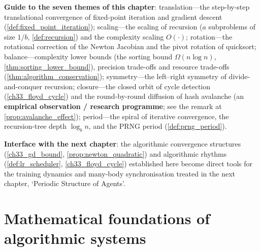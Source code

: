 \begin{definition}
\textbf{Guide to the seven themes of this chapter}: translation---the step-by-step translational convergence of fixed-point iteration and gradient descent (\cref{def:fixed_point_iteration}); scaling---the scaling of recursion ($a$ subproblems of size $1/b$, \cref{def:recursion}) and the complexity scaling $O(\cdot)$; rotation---the rotational correction of the Newton Jacobian and the pivot rotation of quicksort; balance---complexity lower bounds (the sorting bound $\Omega(n\log n)$, \cref{thm:sorting_lower_bound}), precision trade-offs and resource trade-offs (\cref{thm:algorithm_conservation}); symmetry---the left--right symmetry of divide-and-conquer recursion; closure---the closed orbit of cycle detection (\cref{ch33_floyd_cycle}) and the round-by-round diffusion of hash avalanche (an \textbf{empirical observation / research programme}; see the remark at \cref{prop:avalanche_effect}); period---the spiral of iterative convergence, the recursion-tree depth $\log_b n$, and the PRNG period (\cref{def:prng_period}).

\textbf{Interface with the next chapter}: the algorithmic convergence structures (\cref{ch33_gd_bound}, \cref{prop:newton_quadratic}) and algorithmic rhythms (\cref{def:lr_scheduler}, \cref{ch33_floyd_cycle}) established here become direct tools for the training dynamics and many-body synchronisation treated in the next chapter, `Periodic Structure of Agents'.
\end{definition}

\section{Mathematical foundations of algorithmic systems}

